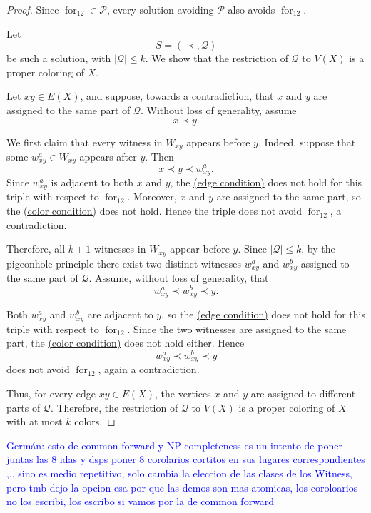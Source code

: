 \documentclass[12pt]{article}
\theoremstyle{plain}
\theoremstyle{definition}
\theoremstyle{remark}
\theoremstyle{definition}
\newcommand{\edgecondition}{%
  \hyperref[def:avoid:cond:edge]{(edge condition)}\xspace
}
\newcommand{\colorcondition}{%
  \hyperref[def:avoid:cond:color]{(color condition)}\xspace
}
\newcommand{\forlabel}{\mathrm{for}}
\DeclareRobustCommand{\forparam}[1]{%
  \ensuremath{\mathop{\forlabel}\nolimits_{#1}}%
}
\newcommand{\german}[1]{%
  \textcolor{blue}{Germán: #1}%
}
\begin{document}
\begin{proof}
Since \(\forparam{12}\in\mathcal P\), every solution avoiding
\(\mathcal P\) also avoids \(\forparam{12}\).

Let
\[
S=(\prec,\mathcal Q)
\]
be such a solution, with \(|\mathcal Q|\le k\). We show that the
restriction of \(\mathcal Q\) to \(V(X)\) is a proper coloring of \(X\).

Let \(xy\in E(X)\), and suppose, towards a contradiction, that \(x\)
and \(y\) are assigned to the same part of \(\mathcal Q\). Without loss
of generality, assume
\[
x\prec y.
\]

We first claim that every witness in \(W_{xy}\) appears before \(y\).
Indeed, suppose that some \(w^a_{xy}\in W_{xy}\) appears after \(y\).
Then
\[
x\prec y\prec w^a_{xy}.
\]
Since \(w^a_{xy}\) is adjacent to both \(x\) and \(y\), the
\edgecondition{} does not hold for this triple with respect to
\(\forparam{12}\). Moreover, \(x\) and \(y\) are assigned to the same
part, so the \colorcondition{} does not hold. Hence the triple does not
avoid \(\forparam{12}\), a contradiction.

Therefore, all \(k+1\) witnesses in \(W_{xy}\) appear before \(y\).
Since \(|\mathcal Q|\le k\), by the pigeonhole principle there exist
two distinct witnesses \(w^a_{xy}\) and \(w^b_{xy}\) assigned to the
same part of \(\mathcal Q\). Assume, without loss of generality, that
\[
w^a_{xy}\prec w^b_{xy}\prec y.
\]

Both \(w^a_{xy}\) and \(w^b_{xy}\) are adjacent to \(y\), so the
\edgecondition{} does not hold for this triple with respect to
\(\forparam{12}\). Since the two witnesses are assigned to the same
part, the \colorcondition{} does not hold either. Hence
\[
w^a_{xy}\prec w^b_{xy}\prec y
\]
does not avoid \(\forparam{12}\), again a contradiction.

Thus, for every edge \(xy\in E(X)\), the vertices \(x\) and \(y\) are
assigned to different parts of \(\mathcal Q\). Therefore, the
restriction of \(\mathcal Q\) to \(V(X)\) is a proper coloring of \(X\)
with at most \(k\) colors.
\end{proof}



\medskip

\german{esto de common forward y NP completeness es un intento de poner juntas
las 8 idas y dsps poner 8 corolarios cortitos en sus lugares correspondientes
,,, sino es medio repetitivo, solo cambia la eleccion de las clases
de los Witness, pero tmb dejo la opcion esa por que las demos son mas atomicas,
los coroloarios no los escribi, los escribo si vamos por la de common forward}
\end{document}
